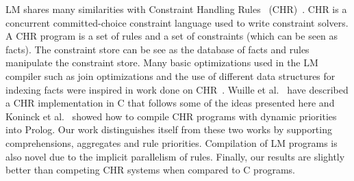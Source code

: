 
LM shares many similarities with Constraint Handling Rules~
(CHR)~\cite{Betz:2005kx,DBLP:journals/corr/abs-1006-3039}.  CHR is a concurrent
committed-choice constraint language used to write constraint solvers. A CHR
program is a set of rules and a set of constraints (which can be seen as facts).
The constraint store can be see as the database of facts and rules manipulate
the constraint store. Many basic optimizations used in the LM compiler such as
join optimizations and the use of different data structures for indexing facts
were inspired in work done on CHR~\cite{DBLP:journals/corr/cs-PL-0408025}.
Wuille et al.~\cite{42866} have described a CHR implementation in C that follows
some of the ideas presented here and Koninck et al.~\cite{chrp} showed how to
compile CHR programs with dynamic priorities into Prolog. Our work distinguishes
itself from these two works by supporting comprehensions, aggregates and rule
priorities. Compilation of LM programs is
also novel due to the implicit parallelism of rules. Finally, our results are
slightly better than competing CHR systems when compared to C programs.
